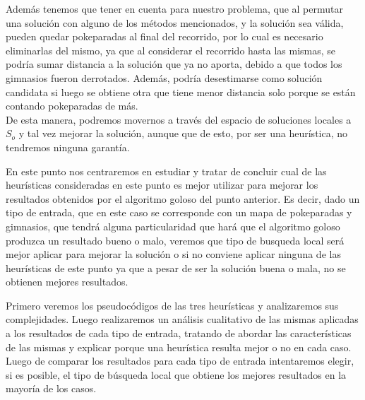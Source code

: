 Además tenemos que tener en cuenta para nuestro problema, que al permutar una solución con alguno de los métodos mencionados, y la solución sea válida, pueden quedar pokeparadas al final del recorrido, por lo cual es necesario eliminarlas del mismo, ya que al considerar el recorrido hasta las mismas, se podría sumar distancia a la solución que ya no aporta, debido a que todos los gimnasios fueron derrotados. Además, podría desestimarse como solución candidata si luego se obtiene otra que tiene menor distancia solo porque se están contando pokeparadas de más.\\

De esta manera, podremos movernos a través del espacio de soluciones locales a $S_o$ y tal vez mejorar la solución, aunque que de esto, por ser una heurística, no tendremos ninguna garantía.

En este punto nos centraremos en estudiar y tratar de concluir cual de las heurísticas consideradas en este punto es mejor utilizar para mejorar los resultados obtenidos por el algoritmo goloso del punto anterior. Es decir, dado un tipo de entrada, que en este caso se corresponde con un mapa de pokeparadas y gimnasios, que tendrá alguna particularidad que hará que el algoritmo goloso produzca un resultado bueno o malo, veremos que tipo de busqueda local será mejor aplicar para mejorar la solución o si no conviene aplicar ninguna de las heurísticas de este punto ya que a pesar de ser la solución buena o mala, no se obtienen mejores resultados.

Primero veremos los pseudocódigos de las tres heurísticas y analizaremos sus complejidades. Luego realizaremos un análisis cualitativo de las mismas aplicadas a los resultados de cada tipo de entrada, tratando de abordar las características de las mismas y explicar porque una heurística resulta mejor o no en cada caso. Luego de comparar los resultados para cada tipo de entrada intentaremos elegir, si es posible, el tipo de búsqueda local que obtiene los mejores resultados en la mayoría de los casos.

